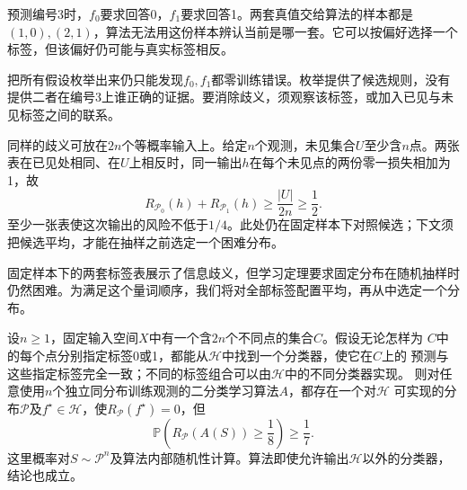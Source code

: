预测编号3时，$f_0$要求回答0，$f_1$要求回答1。两套真值交给算法的样本都是$(1,0),(2,1)$，算法无法用这份样本辨认当前是哪一套。它可以按偏好选择一个标签，但该偏好仍可能与真实标签相反。

把所有假设枚举出来仍只能发现$f_0,f_1$都零训练错误。枚举提供了候选规则，没有提供二者在编号3上谁正确的证据。要消除歧义，须观察该标签，或加入已见与未见标签之间的联系。

同样的歧义可放在$2n$个等概率输入上。给定$n$个观测，未见集合$U$至少含$n$点。两张表在已见处相同、在$U$上相反时，同一输出$h$在每个未见点的两份零一损失相加为1，故
\[
 R_{\mathcal P_0}(h)+R_{\mathcal P_1}(h)
 \geq\frac{|U|}{2n}\geq\frac12.
\]
至少一张表使这次输出的风险不低于$1/4$。此处仍在固定样本下对照候选；下文须把候选平均，才能在抽样之前选定一个困难分布。

固定样本下的两套标签表展示了信息歧义，但学习定理要求固定分布在随机抽样时仍然困难。为满足这个量词顺序，我们将对全部标签配置平均，再从中选定一个分布。

\begin{theorem}[没有免费的午餐]
\label{thm:no-free-lunch-classification}
设$n\geq1$，固定输入空间$X$中有一个含$2n$个不同点的集合$C$。假设无论怎样为
$C$中的每个点分别指定标签0或1，都能从$\mathcal H$中找到一个分类器，使它在$C$上的
预测与这些指定标签完全一致；不同的标签组合可以由$\mathcal H$中的不同分类器实现。
则对任意使用$n$个独立同分布训练观测的二分类学习算法$A$，都存在一个对$\mathcal H$
可实现的分布$\mathcal P$及$f^\star\in\mathcal H$，使$R_{\mathcal P}(f^\star)=0$，但
\begin{equation}
 \mathbb P\left(R_{\mathcal P}(A(S))\geq\frac18\right)\geq\frac17.
 \label{eq:no-free-lunch-probability}
\end{equation}
这里概率对$S\sim\mathcal P^n$及算法内部随机性计算。算法即使允许输出$\mathcal H$以外的分类器，结论也成立。
\end{theorem}


